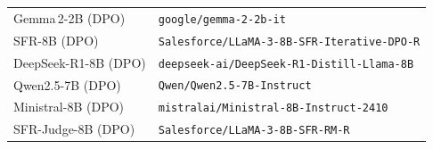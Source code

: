 \documentclass{article}
\theoremstyle{plain}
\theoremstyle{definition}
\theoremstyle{remark}
\begin{document}
\begin{table}[h]
\begin{tabular}{ll}
Gemma\,2-2B (DPO)   & \texttt{google/gemma-2-2b-it} \\
SFR-8B (DPO)        & \texttt{Salesforce/LLaMA-3-8B-SFR-Iterative-DPO-R} \\
DeepSeek-R1-8B (DPO)& \texttt{deepseek-ai/DeepSeek-R1-Distill-Llama-8B} \\
Qwen2.5-7B (DPO)    & \texttt{Qwen/Qwen2.5-7B-Instruct} \\
Ministral-8B (DPO)  & \texttt{mistralai/Ministral-8B-Instruct-2410} \\
SFR-Judge-8B (DPO)  & \texttt{Salesforce/LLaMA-3-8B-SFR-RM-R} \\
\bottomrule
\end{tabular}
\end{table}
\end{document}
